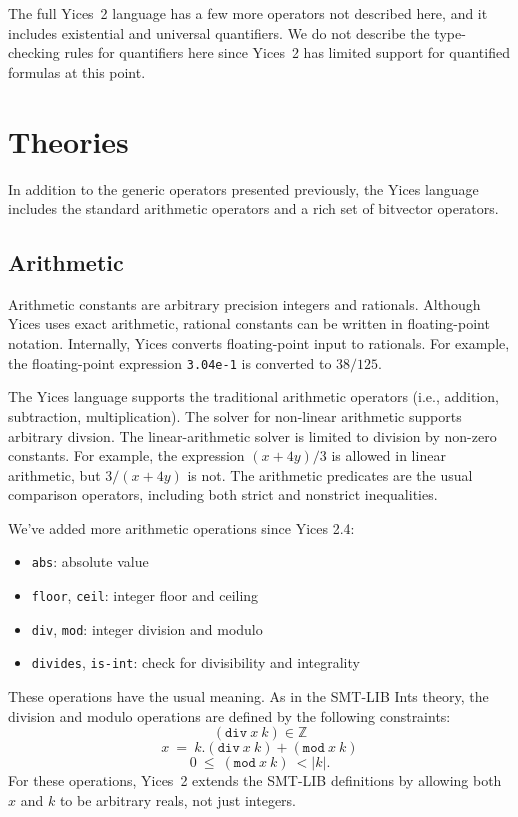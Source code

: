 \documentclass[11pt,twoside,fleqn,openright,titlepage]{cslreport}
\newcommand{\integers}{\ensuremath{\mathbb{Z}}}
\begin{document}
\medskip\noindent
The full Yices~2 language has a few more operators not described here,
and  it includes  existential  and universal  quantifiers.  We do  not
describe the  type-checking rules  for quantifiers here  since Yices~2
has limited support for quantified formulas at this point.


\section{Theories}

In addition  to the generic operators presented  previously, the Yices
language includes the standard arithmetic  operators and a rich set of
bitvector operators.

\subsection{Arithmetic}
\label{arithmetic-general}

Arithmetic constants  are arbitrary precision integers  and rationals.
Although  Yices  uses  exact  arithmetic, rational  constants  can  be
written  in  floating-point   notation.   Internally,  Yices  converts
floating-point input  to rationals.   For example,  the floating-point
expression \texttt{3.04e-1} is converted to $38/125$.

\medskip\noindent The Yices language supports the traditional
arithmetic operators (i.e., addition, subtraction, multiplication).
The solver for non-linear arithmetic supports arbitrary divsion. The
linear-arithmetic solver is limited to division by non-zero constants.
For example, the expression $(x + 4y)/3$ is allowed in linear
arithmetic, but $3/(x + 4y)$ is not. The arithmetic predicates are the
usual comparison operators, including both strict and nonstrict
inequalities.

\medskip\noindent
We've added more arithmetic operations since Yices 2.4:
\begin{itemize}
\item \texttt{abs}: absolute value
\item \texttt{floor}, \texttt{ceil}: integer floor and ceiling
\item \texttt{div}, \texttt{mod}: integer division and modulo
\item \texttt{divides}, \texttt{is-int}: check for divisibility and integrality
\end{itemize}
These operations have the usual meaning. As in the SMT-LIB Ints theory,
the division and modulo operations are defined by the following constraints:
$$(\mathtt{div}\ x\ k)\in \integers$$
$$x~=~k.(\mathtt{div}\ x\ k) + (\mathtt{mod}\ x\ k)$$
$$0~\leq~(\mathtt{mod}\ x\ k)~< |k|.$$ For these operations, Yices~2
extends the SMT-LIB definitions by allowing both $x$ and $k$ to be
arbitrary reals, not just integers.
\end{document}
